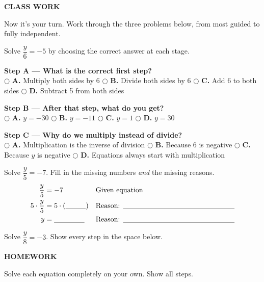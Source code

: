 \documentclass[11pt]{article}
\newcommand{\choice}[2]{\hspace{2mm}$\bigcirc$\; \textbf{#1.} #2}
\newcommand{\banner}[2]{%
  \begin{center}
  \colorbox{#1}{\parbox{0.97\linewidth}{\centering\color{white}\bfseries\Large\vspace{1.2mm} #2 \vspace{1.2mm}}}
  \end{center}%
  \vspace{2mm}
}
\begin{document}
\banner{brandred}{CLASS WORK}
Now it's your turn. Work through the three problems below, from most guided to fully independent.

\begin{mcbox}
Solve $\dfrac{y}{6} = -5$ by choosing the correct answer at each stage.

\textbf{Step A --- What is the correct first step?}\\
\choice{A}{Multiply both sides by 6}\quad
\choice{B}{Divide both sides by 6}\quad
\choice{C}{Add 6 to both sides}\quad
\choice{D}{Subtract 5 from both sides}

\vspace{2mm}
\textbf{Step B --- After that step, what do you get?}\\
\choice{A}{$y = -30$}\quad
\choice{B}{$y = -11$}\quad
\choice{C}{$y = 1$}\quad
\choice{D}{$y = 30$}

\vspace{2mm}
\textbf{Step C --- Why do we multiply instead of divide?}\\
\choice{A}{Multiplication is the inverse of division}\quad
\choice{B}{Because 6 is negative}\quad
\choice{C}{Because $y$ is negative}\quad
\choice{D}{Equations always start with multiplication}
\end{mcbox}

\begin{fillbox}
Solve $\dfrac{y}{5} = -7$. Fill in the missing numbers \emph{and} the missing reasons.
\begin{align*}
\dfrac{y}{5} &= -7 &&\text{Given equation}\\
5\cdot\dfrac{y}{5} &= 5\cdot(\underline{\hspace{1cm}}) &&\text{Reason: }\underline{\hspace{5.5cm}}\\
y &= \underline{\hspace{1.5cm}} &&\text{Reason: }\underline{\hspace{5.5cm}}
\end{align*}
\end{fillbox}

\begin{indepbox}
Solve $\dfrac{y}{8} = -3$. Show every step in the space below.

\vspace{18mm}
\end{indepbox}

\vspace{2mm}
\banner{black!75}{HOMEWORK}
Solve each equation completely on your own. Show all steps.
\end{document}
